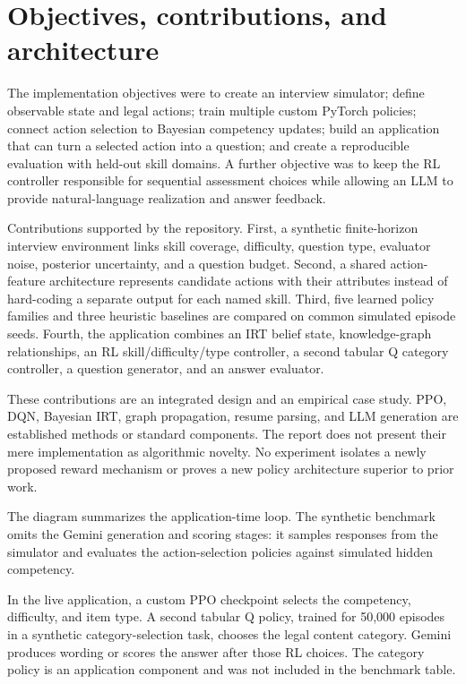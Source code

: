 \documentclass{ieeeaccess}
\begin{document}
\section{Objectives, contributions, and architecture}

The implementation objectives were to create an interview simulator; define observable state and legal actions; train multiple custom PyTorch policies; connect action selection to Bayesian competency updates; build an application that can turn a selected action into a question; and create a reproducible evaluation with held-out skill domains. A further objective was to keep the RL controller responsible for sequential assessment choices while allowing an LLM to provide natural-language realization and answer feedback.

Contributions supported by the repository. First, a synthetic finite-horizon interview environment links skill coverage, difficulty, question type, evaluator noise, posterior uncertainty, and a question budget. Second, a shared action-feature architecture represents candidate actions with their attributes instead of hard-coding a separate output for each named skill. Third, five learned policy families and three heuristic baselines are compared on common simulated episode seeds. Fourth, the application combines an IRT belief state, knowledge-graph relationships, an RL skill/difficulty/type controller, a second tabular Q category controller, a question generator, and an answer evaluator.

These contributions are an integrated design and an empirical case study. PPO, DQN, Bayesian IRT, graph propagation, resume parsing, and LLM generation are established methods or standard components. The report does not present their mere implementation as algorithmic novelty. No experiment isolates a newly proposed reward mechanism or proves a new policy architecture superior to prior work.

The diagram summarizes the application-time loop. The synthetic benchmark omits the Gemini generation and scoring stages: it samples responses from the simulator and evaluates the action-selection policies against simulated hidden competency.

In the live application, a custom PPO checkpoint selects the competency, difficulty, and item type. A second tabular Q policy, trained for 50,000 episodes in a synthetic category-selection task, chooses the legal content category. Gemini produces wording or scores the answer after those RL choices. The category policy is an application component and was not included in the benchmark table.
\end{document}
